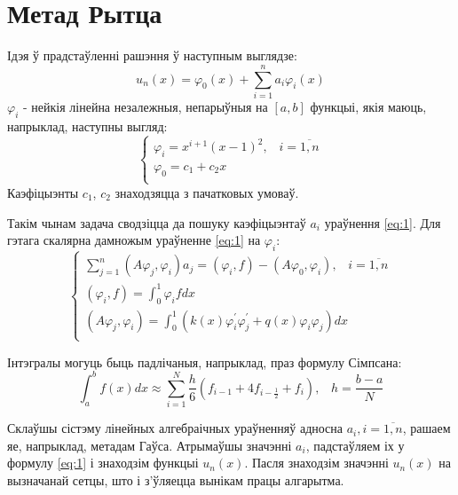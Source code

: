 \section{Метад Рытца}
Ідэя ў прадстаўленні рашэння ў наступным выглядзе:
\begin{equation} \label{eq:1}
    u_n(x) = \varphi_0(x) + \sum_{i=1}^n a_{i}\varphi_{i}(x)
\end{equation}
$\varphi_{i}$ - нейкія лінейна незалежныя, непарыўныя на $[a, b]$ функцыі, якія маюць, напрыклад, наступны выгляд:
\begin{equation}
    \begin{cases}
        \varphi_i = x^{i+1}(x-1)^2, \hspace{10pt} i = \overline{1,n} \\
        \varphi_0 = c_1 + c_{2}x \\
    \end{cases}
\end{equation}
Каэфіцыэнты $c_{1}$, $c_{2}$ знаходзяцца з пачатковых умоваў.

Такім чынам задача сводзіцца да пошуку каэфіцыэнтаў $a_{i}$ ураўнення \eqref{eq:1}. Для гэтага скалярна дамножым ураўненне \eqref{eq:1} на $\varphi_i$:
\begin{equation}
    \begin{cases}
        \sum_{j=1}^n(A\varphi_j, \varphi_i)a_j = (\varphi_i, f) - (A\varphi_0, \varphi_i), \hspace{10pt} i = \overline{1,n} \\
        (\varphi_i, f) = \int_0^1\varphi_i f dx \\
        (A\varphi_j, \varphi_i) = \int_0^1(k(x)\varphi_i^{\prime}\varphi_j^{\prime} + q(x)\varphi_i\varphi_j) dx \\
    \end{cases}
\end{equation}

Інтэгралы могуць быць падлічаныя, напрыклад, праз формулу Сімпсана:
\begin{equation}
    \int_a^b f(x)dx \approx \sum_{i=1}^{N} \frac{h}{6}(f_{i-1} + 4f_{i-\frac{1}{2}} + f_i), \hspace{10pt} h = \frac{b-a}{N}
\end{equation}

Склаўшы сістэму лінейных алгебраічных ураўненняў адносна $a_i, i = \overline{1,n}$, рашаем яе, напрыклад, метадам Гаўса. Атрымаўшы значэнні $a_i$, падстаўляем іх у формулу \eqref{eq:1} і знаходзім функцыі $u_{n}(x)$. Пасля знаходзім значэнні $u_{n}(x)$ на вызначанай сетцы, што і з'ўляецца вынікам працы алгарытма.

